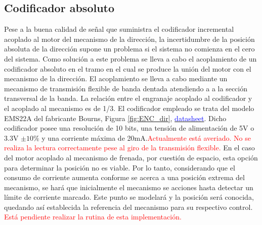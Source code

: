 \subsection{Codificador absoluto} \label{Subsec:Encoder}
Pese a la buena calidad de señal que suministra el codificador incremental acoplado al motor del mecanismo de la dirección, la incertidumbre de la posición absoluta de la dirección supone un problema si el sistema no comienza en el cero del sistema. Como solución a este problema se lleva a cabo el acoplamiento de un codificador absoluto en el tramo en el cual se produce la unión del motor con el mecanismo de la dirección. El acoplamiento se lleva a cabo mediante un mecanismo de transmisión flexible de banda dentada atendiendo a a la sección transversal de la banda. La relación entre el engranaje acoplado al codificador y el acoplado al mecanismo es de 1/3. El codificador empleado se trata del modelo EMS22A del fabricante Bourns, Figura \ref{fig:ENC_dir}, \href{https://github.com/ual-arm/ual-ecar-docs/blob/master/Datasheet/Encoder-EMS22A.pdf}{\textcolor{blue}{datasheet}}. Dicho codificador posee una resolución de 10 bits, una tensión de alimentación de 5V o 3.3V $\pm10\%$ y una corriente máxima de 20mA.\textcolor{red}{Actualmente está averiado. No se realiza la lectura correctamente pese al giro de la transmisión flexible.} En el caso del motor acoplado al mecanismo de frenada, por cuestión de espacio, esta opción para determinar la posición no es viable. Por lo tanto, considerando que el consumo de corriente aumenta conforme se acerca a una posición extrema del mecanismo, se hará que inicialmente el mecanismo se acciones hasta detectar un límite de corriente marcado. Este punto se modelará y la posición será conocida, quedando así establecida la referencia del mecanismo para su respectivo control. \textcolor{red}{Está pendiente realizar la rutina de esta implementación.}


